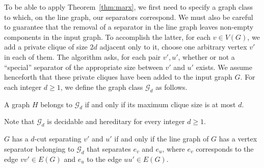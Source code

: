 To be able to apply Theorem~\ref{thm:marx}, we first need to specify a graph class to which, on the line graph, our separators correspond. We must also be careful to guarantee that the removal of a separator in the line graph leaves non-empty components in the input graph. To accomplish the latter, for each $v \in V(G)$, we add a private clique of size $2d$ adjacent only to it, choose one arbitrary vertex $v'$ in each of them. The algorithm asks, for each pair $v',u'$, whether or not a ``special'' separator of the appropriate size between $v'$ and $u'$ exists.
We assume henceforth that these private cliques have been added to the input graph $G$.
For each integer $d \geq 1$, we define the graph class $\mathcal{G}_d$ as follows.

\begin{definition}
    A graph $H$ belongs to $\mathcal{G}_d$ if and only if its maximum clique size is at most $d$.
\end{definition}

Note that $\mathcal{G}_d$ is decidable and hereditary for every integer $d \geq 1$.


\begin{lemma}
    \label{lem:cut_mincut}
    $G$ has a $d$-cut separating $v'$ and $u'$ if and only if the line graph of $G$ has a vertex separator belonging to $\mathcal{G}_d$ that separates $e_v$ and $e_u$, where $e_v$ corresponds to the edge $vv' \in E(G)$ and $e_u$ to the edge $uu' \in E(G)$.
\end{lemma}

